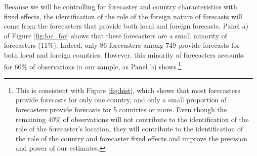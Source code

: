 Because we will be controlling for forecaster and country characteristics with fixed effects, the identification of the role of the foreign nature of forecasts will come from the forecasters that provide both local and foreign forecasts. Panel a) of Figure \ref{fig:loc_for} shows that these forecasters are a small minority of forecasters (11\%). Indeed, only 86 forecasters among 749 provide forecasts for both local and foreign countries. However, this minority of forecasters accounts for 60\% of observations in our sample, as Panel b) shows.\footnote{This is consistent with Figure \ref{fig:hist}, which shows that most forecasters provide forecasts for only one country, and only a small proportion of forecasters provide forecasts for 5 countries or more. Even though the remaining 40\% of observations will not contribute to the identification of the role of the forecaster's location, they will contribute to the identification of the role of the country and forecaster fixed effects and improve the precision and power of our estimates.} %

